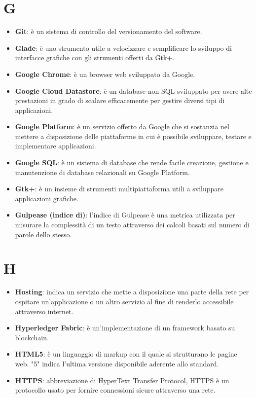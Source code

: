 \documentclass[a4paper, oneside, openany, dvipsnames, table]{article}
\begin{document}
\section{G}
\begin{itemize}
\item \textbf{Git}: è un sistema di controllo del versionamento del software.
\item \textbf{Glade}: è uno strumento utile a velocizzare e semplificare lo sviluppo di interfacce grafiche con gli strumenti offerti da Gtk+.
\item \textbf{Google Chrome}: è un browser web sviluppato da Google.
\item \textbf{Google Cloud Datastore}: è un database non SQL sviluppato per avere alte prestazioni in grado di scalare efficacemente per gestire diversi tipi di applicazioni.
\item \textbf{Google Platform}: è un servizio offerto da Google che si sostanzia nel mettere a disposizione delle piattaforme in cui è possibile sviluppare, testare e implementare applicazioni.
\item \textbf{Google SQL}: è un sistema di database che rende facile creazione, gestione e manutenzione di database relazionali su Google Platform.
\item \textbf{Gtk+}: è un insieme di strumenti multipiattaforma utili a sviluppare applicazioni grafiche.
\item \textbf{Gulpease (indice di)}: l'indice di Gulpease è una metrica utilizzata per misurare la complessità di un testo attraverso dei calcoli basati sul numero di parole dello stesso.
\end{itemize}

\section{H}
\begin{itemize}
\item \textbf{Hosting}: indica un servizio che mette a disposizione una parte della rete per ospitare un'applicazione o un altro servizio al fine di renderlo accessibile attraverso internet.
\item \textbf{Hyperledger Fabric}: è un'implementazione di un framework basato su blockchain.
\item \textbf{HTML5}: è un linguaggio di markup con il quale si strutturano le pagine web. "5" indica l'ultima versione disponibile aderente allo standard.
\item \textbf{HTTPS}: abbreviazione di HyperText Transfer Protocol, HTTPS è un protocollo usato per fornire connessioni sicure attraverso una rete.
\end{itemize}
\end{document}
